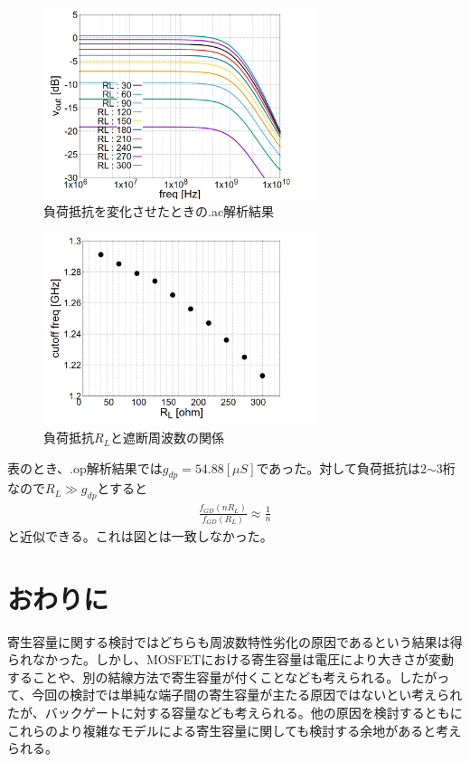 \documentclass[twocolumn]{jsarticle}
\begin{document}
    \newpage

    \begin{figure}[h]
        \begin{center}
            \includegraphics*[width=80mm]{graphes/bitmap/Fgd_vout_ac.PNG}
            \caption{負荷抵抗を変化させたときの.ac解析結果}
            \label{graph:fgd_vout_ac}
        \end{center}
    \end{figure}

    \begin{figure}[h]
        \begin{center}
            \includegraphics*[width=80mm]{graphes/bitmap/RL_cutooff.PNG}
            \caption{負荷抵抗$R_{L}$と遮断周波数の関係}
            \label{fig:rl_cutoff}
        \end{center}        
    \end{figure}
    
    表のとき、.op解析結果では$g_{dp}=54.88[\mu S]$であった。対して負荷抵抗は2$\sim$3桁なので$R_{L}\gg g_{dp}$とすると
    \begin{align*}
        \frac{f_{GD}(nR_{L})}{f_{GD}(R_{L})}\approx \frac{1}{n}
    \end{align*}
    と近似できる。これは図とは一致しなかった。


\section{おわりに}
    寄生容量に関する検討ではどちらも周波数特性劣化の原因であるという結果は得られなかった。しかし、MOSFETにおける寄生容量は電圧により大きさが変動することや、別の結線方法で寄生容量が付くことなども考えられる。したがって、今回の検討では単純な端子間の寄生容量が主たる原因ではないとい考えられたが、バックゲートに対する容量なども考えられる。他の原因を検討するともにこれらのより複雑なモデルによる寄生容量に関しても検討する余地があると考えられる。
\end{document}
